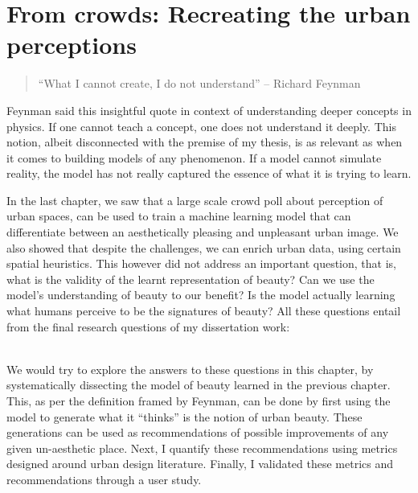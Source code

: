 \chapter{From crowds: Recreating the urban perceptions}
\graphicspath{{Chapter4/plots/} {Chapter5/plots/examples/} {Chapter5/plots/GAN_examples/}}

\label{chap:generation}
\begin{quote}
    ``What I cannot create, I do not understand'' -- Richard Feynman
\end{quote}
Feynman said this insightful quote in context of understanding deeper concepts in physics. If one cannot teach a concept, one does not understand it deeply. 
This notion, albeit disconnected with the premise of my thesis, is as relevant as when it comes to building models of any phenomenon. If a model cannot simulate reality, the model has not really captured the essence of what it is trying to learn. 

In the last chapter, we saw that a large scale crowd poll about perception of urban spaces, can be used to train a machine learning model that can differentiate between an aesthetically pleasing and unpleasant urban image. We also showed that despite the challenges, we can enrich urban data, using certain spatial heuristics. This however did not address an important question, that is, what is the validity of the learnt representation of beauty? Can we use the model's understanding of beauty to our benefit? Is the model actually learning what humans perceive to be the signatures of beauty?
All these questions entail from the final research questions of my dissertation work: 

\noindent{}
\\

We would try to explore the answers to these questions in this chapter, by systematically dissecting the model of beauty learned in the previous chapter. This, as per the definition framed by Feynman, can be done by first using the model to generate what it ``thinks'' is the notion of urban beauty. These generations can be used as recommendations of possible improvements of any given un-aesthetic place. Next, I quantify these recommendations using metrics designed around urban design literature. Finally, I validated these metrics and recommendations through a user study.  


